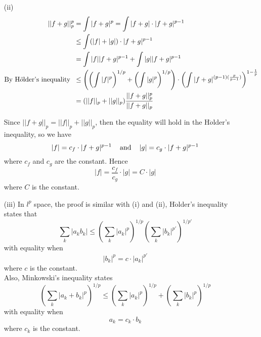 \documentclass[a4paper,11pt]{article}
\begin{document}
\begin{enumerate}
\begin{enumerate}
		\item [(ii)]
			$$\begin{aligned}
			||f + g||_p^p
			&= \int |f + g|^p = \int |f + g| \cdot |f + g|^{p-1}\\
			&\leq \int (|f| + |g|) \cdot |f + g|^{p-1}\\
			&= \int |f| |f+g|^{p-1} + \int |g| |f+g|^{p-1}\\
			\text{By H$\ddot{o}$lder's inequality} \hspace{0.2cm}
			&\leq \left( \left( \int |f|^p \right)^{1/p} + \left( \int |g|^p \right)^{1/p} \right) \cdot \left( \int |f+g|^{(p-1)(\frac{p}{p-1})} \right)^{1 - \frac{1}{p}}\\
			&= (||f||_p + ||g||_p) \frac{||f+g||_p^p}{||f+g||_p}
			\end{aligned}$$

			Since $||f+g||_p = ||f||_p + ||g||_p$, then the equality will hold in the H$\ddot{o}$lder's inequality, so we have
				$$|f| = c_f \cdot |f+g|^{p-1} \hspace{0.4cm} \text{and} \hspace{0.4cm} |g| = c_g \cdot |f+g|^{p-1}$$
			where $c_f$ and $c_g$ are the constant.
			Hence
				$$|f| = \frac{c_f}{c_g} \cdot |g| = C \cdot |g|$$
			where $C$ is the constant.\\

		\item [(iii)]
			In $l^p$ space, the proof is similar with (i) and (ii), H$\ddot{\text{o}}$lder's inequality states that
				$$\sum_k |a_k b_k| \leq \left( \sum_k |a_k|^p \right)^{1/p} \left( \sum_k |b_k|^{p'} \right)^{1/p'}$$
			with equality when
				$$|b_k|^p = c \cdot |a_k|^{p'}$$
			where $c$ is the constant.\\
			Also, Minkowski's inequality states
				$$\left( \sum_k |a_k + b_k|^p \right)^{1/p} \leq \left( \sum_k |a_k|^p \right)^{1/p} + \left( \sum_k |b_k|^p \right)^{1/p}$$
			with equality when
				$$a_k = c_k \cdot b_k$$
			where $c_k$ is the constant.\\

	\end{enumerate}



\end{enumerate}
\end{document}
